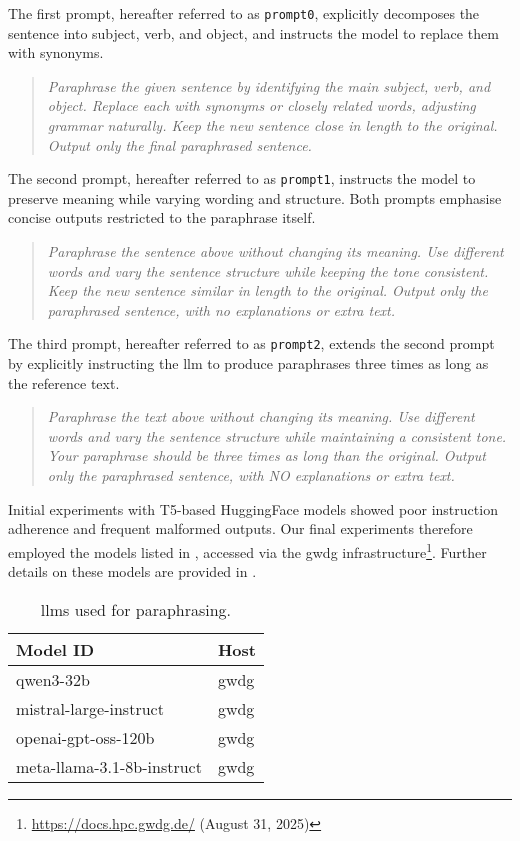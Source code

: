 The first prompt, hereafter referred to as \texttt{prompt0}, explicitly decomposes the sentence into subject, verb, and object, and instructs the model to replace them with synonyms.
\begin{quote}
    \textit{Paraphrase the given sentence by identifying the main subject, verb, and object. Replace each with synonyms or closely related words, adjusting grammar naturally. Keep the new sentence close in length to the original. Output only the final paraphrased sentence.}
\end{quote}

The second prompt, hereafter referred to as \texttt{prompt1}, instructs the model to preserve meaning while varying wording and structure. 
Both prompts emphasise concise outputs restricted to the paraphrase itself.
\begin{quote}
    \textit{Paraphrase the sentence above without changing its meaning. Use different words and vary the sentence structure while keeping the tone consistent. Keep the new sentence similar in length to the original. Output only the paraphrased sentence, with no explanations or extra text.}
\end{quote}

The third prompt, hereafter referred to as \texttt{prompt2}, extends the second prompt by explicitly instructing the \ac{llm} to produce paraphrases three times as long as the reference text.
\begin{quote}
  \textit{Paraphrase the text above without changing its meaning. Use different words and vary the sentence structure while maintaining a consistent tone. Your paraphrase should be three times as long than the original. Output only the paraphrased sentence, with NO explanations or extra text.}
\end{quote}

Initial experiments with T5-based HuggingFace models showed poor instruction adherence and frequent malformed outputs. 
Our final experiments therefore employed the models listed in , accessed via the \ac{gwdg} infrastructure\footnote{\url{https://docs.hpc.gwdg.de/} (August 31, 2025)}.
Further details on these models are provided in .

\begin{table}[h]
\centering
\caption{\acp{llm} used for paraphrasing.}
\label{tab:base_llms}
\begin{tabular}{@{}ll@{}}
\toprule
\textbf{Model ID}                    & \textbf{Host} \\
\midrule
qwen3-32b                            & \ac{gwdg}    \\
mistral-large-instruct               & \ac{gwdg}    \\
openai-gpt-oss-120b                  & \ac{gwdg}    \\
meta-llama-3.1-8b-instruct           & \ac{gwdg}    \\
\bottomrule   
\end{tabular}%
\end{table}


